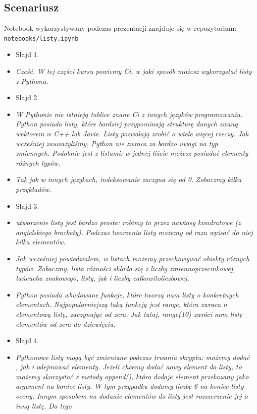 \documentclass{mwart}
\begin{document}
\subsection{Scenariusz}
Notebook wykorzystywany podczas prezentacji znajduje się w repozytorium: \texttt{notebooks/listy.ipynb}
\begin{itemize}
  \item Slajd 1.
  \item \emph{Cześć. W tej części kursu powiemy Ci, w jaki sposób możesz wykorzystać
      listy z Pythona. }
  \item Slajd 2.
  \item \emph{W Pythonie nie istnieją tablice znane Ci z innych języków
      programowania. Python posiada listy, które bardziej przypominają strukturę danych
      zwaną wektorem w C++ lub Javie. Listy pozwalają zrobić o wiele więcej rzeczy. Jak
      wcześniej zauważyliśmy, Python nie zwraca za bardzo uwagi na typ zmiennych.
      Podobnie jest z listami: w jednej liście możesz posiadać elementy różnych typów. }
  \item \emph{Tak jak w innych językach, indeksowanie zaczyna się od 0. Zobaczmy kilka
      przykładów.}
  \item Slajd 3.
  \item \emph{utworzenie listy jest bardzo proste: robimy to przez nawiasy kwadratowe
      (z angielskiego brackety). Podczas tworzenia listy możemy od razu wpisać do niej
      kilka elementów.}
  \item \emph{Jak wcześniej powiedziałem, w listach możemy przechowywać obiekty różnych
      typów. Zobaczmy, lista różności składa się z liczby zmiennoprzecinkowej, łańcucha
      znakowego, listy, jak i liczby całkowitoliczbowej.}
  \item \emph{Python posiada wbudowane funkcje, które tworzą nam listy o konkretnych
      elementach. Najpopularniejszą taką funkcją jest range, która zwraca
      n elementową listę, zaczynając od zera. Jak tutaj, range(10) zwróci nam
      listę elementów od zera do dziewięciu.}
  \item Slajd 4.
  \item \emph{Pythonowe listy mogą być zmieniane podczas trwania skryptu: możemy dodać ,
      jak i odejmować elementy. Jeżeli chcemy dodać nowy element do listy, to możemy
      skorzystać z metody append(), która dodaje element przekazany jako argument na
      koniec listy. W tym przypadku dodamy liczbę 6 na koniec listy oceny. Innym
      sposobem na dodanie elementów do listy jest rozszerzenie jej o inną listę. Do tego
}
\end{itemize}
\end{document}
